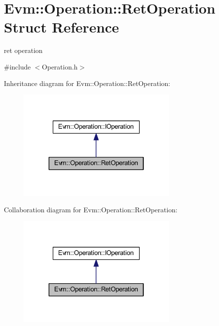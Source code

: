 \hypertarget{struct_evm_1_1_operation_1_1_ret_operation}{}\section{Evm\+:\+:Operation\+:\+:Ret\+Operation Struct Reference}
\label{struct_evm_1_1_operation_1_1_ret_operation}


ret operation  




{\ttfamily \#include $<$Operation.\+h$>$}



Inheritance diagram for Evm\+:\+:Operation\+:\+:Ret\+Operation\+:
\nopagebreak
\begin{figure}[H]
\begin{center}
\leavevmode
\includegraphics[width=226pt]{struct_evm_1_1_operation_1_1_ret_operation__inherit__graph}
\end{center}
\end{figure}


Collaboration diagram for Evm\+:\+:Operation\+:\+:Ret\+Operation\+:
\nopagebreak
\begin{figure}[H]
\begin{center}
\leavevmode
\includegraphics[width=226pt]{struct_evm_1_1_operation_1_1_ret_operation__coll__graph}
\end{center}
\end{figure}
